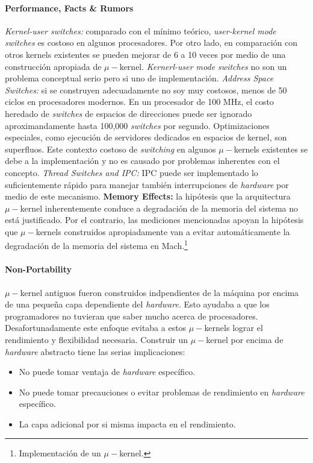 \paragraph{\textnormal{\textbf{Performance, Facts \& Rumors}}}
\textit{Kernel-user switches:} comparado con el mínimo teórico, \textit{user-kernel mode switches} es costoso en algunos procesadores. Por otro lado, en comparación con otros kernels existentes se pueden mejorar de 6 a 10 veces por medio de una construcción apropiada de $\mu-$kernel. \textit{Kernerl-user mode switches} no son un problema conceptual serio pero si uno de implementación. \textit{Address Space Switches:} si se construyen adecuadamente no soy muy costosos, menos de 50 ciclos en procesadores modernos. En un procesador de 100 MHz, el costo heredado de \textit{switches} de espacios de direcciones puede ser ignorado aproximandamente hasta 100,000 \textit{switches} por segundo. Optimizaciones especiales, como ejecución de servidores dedicados en espacios de kernel, son superfluos. Este contexto costoso de \textit{switching} en algunos $\mu-$kernels existentes se debe a la implementación y no es causado por problemas inherentes con el concepto. \textit{Thread Switches and IPC:} IPC puede ser implementado lo suficientemente rápido para manejar también interrupciones de \textit{hardware} por medio de este mecanismo. \textbf{Memory Effects:} la hipótesis que la arquitectura $\mu-$kernel inherentemente conduce a degradación de la memoria del sistema no está justificado. Por el contrario, las mediciones mencionadas apoyan la hipótesis que $\mu-$kernels construidos apropiadamente van a evitar automáticamente la degradación de la memoria del sistema en Mach.\footnote{Implementación de un $\mu-$kernel.}

\paragraph{\textnormal{\textbf{Non-Portability}}}
$\mu-$kernel antiguos fueron construidos indpendientes de la máquina por encima de una pequeña capa dependiente del \textit{hardware}. Esto ayudaba a que los programadores no tuvieran que saber mucho acerca de procesadores. Desafortunadamente este enfoque evitaba a estos $\mu-$kernels lograr el rendimiento y flexibilidad necesaria. Construir un $\mu-$kernel por encima de \textit{hardware} abstracto tiene las serias implicaciones:
\begin{itemize}
    \item No puede tomar ventaja de \textit{hardware} específico.
    \item No puede tomar precauciones o evitar problemas de rendimiento en \textit{hardware} específico.
    \item La capa adicional por si misma impacta en el rendimiento.
\end{itemize}

